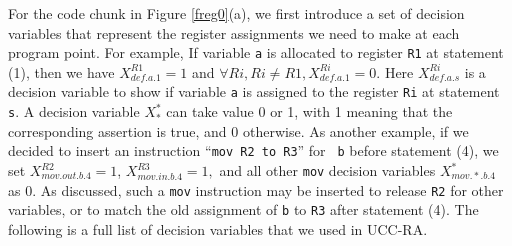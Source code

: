 For the code chunk in Figure \ref{freg0}(a), we first introduce a set
of decision variables that represent the register assignments we need
to make at each program point. For example, If variable {\tt a} is allocated to
register {\tt R1} at statement (1), then we have $X_{def.a.1}^{R1}=1$
and $\forall Ri, Ri\neq R1, X_{def.a.1}^{Ri}=0$. Here
$X_{def.a.s}^{Ri}$ is a decision variable to show if variable {\tt a}
is assigned to the register {\tt Ri} at statement {\tt s}. A decision
variable $X_{*}^{*}$ can take value 0 or 1, with 1 meaning that the
corresponding assertion is true, and 0 otherwise. As another example,
if we decided to insert an instruction ``{\tt mov R2 to R3}'' for {\tt
b} before statement (4), we set $ X_{mov.out.b.4}^{R2}=1$,
$X_{mov.in.b.4}^{R3}=1,$ and all other {\tt mov} decision variables
$X_{mov.*.b.4}^{*}$ as 0. As discussed, such a {\tt mov}
instruction may be inserted to release {\tt R2} for other variables,
or to match the old assignment of {\tt b} to {\tt R3} after statement
(4).  The following is a full list of decision variables that we used in
UCC-RA.
